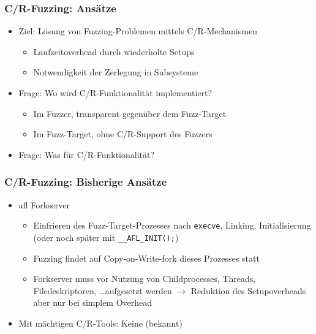 \documentclass[handout]{beamer}
\begin{document}
\begin{frame}
    \frametitle{C/R-Fuzzing: Ansätze}
    \begin{itemize}
        \item Ziel: Lösung von Fuzzing-Problemen mittels C/R-Mechanismen
            \begin{itemize}
                \item Laufzeitoverhead durch wiederholte Setups
                \item Notwendigkeit der Zerlegung in Subsysteme
            \end{itemize}
        \item Frage: Wo wird C/R-Funktionalität implementiert?
            \begin{itemize}
                \item Im Fuzzer, transparent gegenüber dem Fuzz-Target
                \item Im Fuzz-Target, ohne C/R-Support des Fuzzers
            \end{itemize}
        \item Frage: Was für C/R-Funktionalität?
    \end{itemize}
\end{frame}

\begin{frame}
    \frametitle{C/R-Fuzzing: Bisherige Ansätze}
    \begin{itemize}
        \item afl Forkserver
            \begin{itemize}
                \item Einfrieren des Fuzz-Target-Prozesses nach \texttt{execve}, Linking, Initialisierung (oder noch später mit \texttt{\_\_AFL\_INIT();})
                \item Fuzzing findet auf Copy-on-Write-fork dieses Prozesses statt
                \item Forkserver muss vor Nutzung von Childprocesses, Threads, Filedeskriptoren, \dots aufgesetzt werden
                    $\rightarrow$ Reduktion des Setupoverheads aber nur bei simplem Overhead
            \end{itemize}
        \item Mit mächtigen C/R-Tools: Keine (bekannt)
    \end{itemize}
\end{frame}
\end{document}
